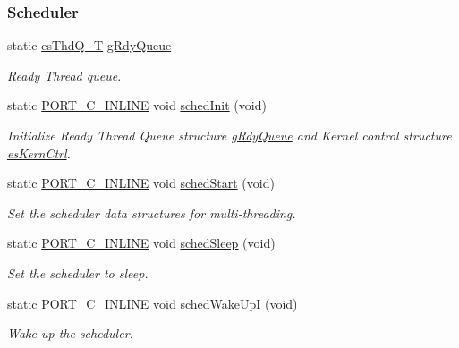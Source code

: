 \subsubsection*{Scheduler}
\begin{DoxyCompactItemize}
\item 
static \hyperlink{group__kern__intf_ga7a1a060699e83a01512ebb5540019556}{es\-Thd\-Q\-\_\-\-T} \hyperlink{group__kern__impl_ga185694d8732651c7426a7d1dbd2d6bb8}{g\-Rdy\-Queue}
\begin{DoxyCompactList}\small\item\em Ready Thread queue. \end{DoxyCompactList}\item 
static \hyperlink{group__template__compiler_ga87952d6e574c7f437503926e833ba345}{P\-O\-R\-T\-\_\-\-C\-\_\-\-I\-N\-L\-I\-N\-E} void \hyperlink{group__kern__impl_ga3a8d1dd61629856ac10022cd044591a3}{sched\-Init} (void)
\begin{DoxyCompactList}\small\item\em Initialize Ready Thread Queue structure \hyperlink{group__kern__impl_ga185694d8732651c7426a7d1dbd2d6bb8}{g\-Rdy\-Queue} and Kernel control structure \hyperlink{structesKernCtrl}{es\-Kern\-Ctrl}. \end{DoxyCompactList}\item 
static \hyperlink{group__template__compiler_ga87952d6e574c7f437503926e833ba345}{P\-O\-R\-T\-\_\-\-C\-\_\-\-I\-N\-L\-I\-N\-E} void \hyperlink{group__kern__impl_gaa2fd7336d999c956fa8b74a2405cffc7}{sched\-Start} (void)
\begin{DoxyCompactList}\small\item\em Set the scheduler data structures for multi-\/threading. \end{DoxyCompactList}\item 
static \hyperlink{group__template__compiler_ga87952d6e574c7f437503926e833ba345}{P\-O\-R\-T\-\_\-\-C\-\_\-\-I\-N\-L\-I\-N\-E} void \hyperlink{group__kern__impl_gaaab2c30affeef2604f69bea4d19f32e4}{sched\-Sleep} (void)
\begin{DoxyCompactList}\small\item\em Set the scheduler to sleep. \end{DoxyCompactList}\item 
static \hyperlink{group__template__compiler_ga87952d6e574c7f437503926e833ba345}{P\-O\-R\-T\-\_\-\-C\-\_\-\-I\-N\-L\-I\-N\-E} void \hyperlink{group__kern__impl_ga0ac09697c7f2168695a853598caac057}{sched\-Wake\-Up\-I} (void)
\begin{DoxyCompactList}\small\item\em Wake up the scheduler. \end{DoxyCompactList}\item 

\end{DoxyCompactItemize}
